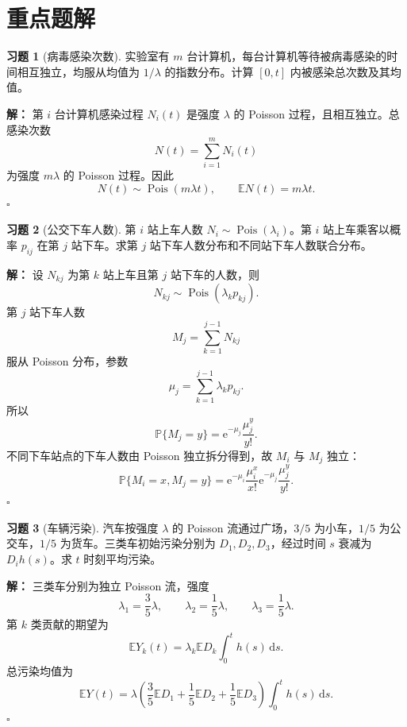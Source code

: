 \documentclass[12pt,a4paper,openany]{ctexrep}
\theoremstyle{definition}
\newtheorem{exercise}{习题}[section]
\newenvironment{solution}{\par\noindent\textbf{解：}}{\hfill$\square$\par}
\newcommand{\E}{\mathbb{E}}
\newcommand{\Pp}{\mathbb{P}}
\newcommand{\Pois}{\operatorname{Pois}}
\newcommand{\dd}{\,\mathrm{d}}
\newcommand{\e}{\mathrm{e}}
\begin{document}
\section{重点题解}

\begin{exercise}[病毒感染次数]
实验室有 $m$ 台计算机，每台计算机等待被病毒感染的时间相互独立，均服从均值为 $1/\lambda$ 的指数分布。计算 $[0,t]$ 内被感染总次数及其均值。
\end{exercise}

\begin{solution}
第 $i$ 台计算机感染过程 $N_i(t)$ 是强度 $\lambda$ 的 Poisson 过程，且相互独立。总感染次数
\[
N(t)=\sum_{i=1}^m N_i(t)
\]
为强度 $m\lambda$ 的 Poisson 过程。因此
\[
N(t)\sim\Pois(m\lambda t),\qquad \E N(t)=m\lambda t.
\]
\end{solution}

\begin{exercise}[公交下车人数]
第 $i$ 站上车人数 $N_i\sim\Pois(\lambda_i)$。第 $i$ 站上车乘客以概率 $p_{ij}$ 在第 $j$ 站下车。求第 $j$ 站下车人数分布和不同站下车人数联合分布。
\end{exercise}

\begin{solution}
设 $N_{kj}$ 为第 $k$ 站上车且第 $j$ 站下车的人数，则
\[
N_{kj}\sim \Pois(\lambda_k p_{kj}).
\]
第 $j$ 站下车人数
\[
M_j=\sum_{k=1}^{j-1}N_{kj}
\]
服从 Poisson 分布，参数
\[
\mu_j=\sum_{k=1}^{j-1}\lambda_kp_{kj}.
\]
所以
\[
\Pp\{M_j=y\}=\e^{-\mu_j}\frac{\mu_j^y}{y!}.
\]
不同下车站点的下车人数由 Poisson 独立拆分得到，故 $M_i$ 与 $M_j$ 独立：
\[
\Pp\{M_i=x,M_j=y\}
=
\e^{-\mu_i}\frac{\mu_i^x}{x!}
\e^{-\mu_j}\frac{\mu_j^y}{y!}.
\]
\end{solution}

\begin{exercise}[车辆污染]
汽车按强度 $\lambda$ 的 Poisson 流通过广场，$3/5$ 为小车，$1/5$ 为公交车，$1/5$ 为货车。三类车初始污染分别为 $D_1,D_2,D_3$，经过时间 $s$ 衰减为 $D_i h(s)$。求 $t$ 时刻平均污染。
\end{exercise}

\begin{solution}
三类车分别为独立 Poisson 流，强度
\[
\lambda_1=\frac35\lambda,\qquad
\lambda_2=\frac15\lambda,\qquad
\lambda_3=\frac15\lambda.
\]
第 $k$ 类贡献的期望为
\[
\E Y_k(t)=\lambda_k\E D_k\int_0^t h(s)\dd s.
\]
总污染均值为
\[
\E Y(t)
=
\lambda\left(
\frac35\E D_1+\frac15\E D_2+\frac15\E D_3
\right)
\int_0^t h(s)\dd s.
\]
\end{solution}
\end{document}
